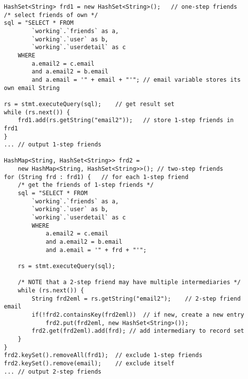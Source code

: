 \begin{lstlisting}
HashSet<String> frd1 = new HashSet<String>();	// one-step friends
/* select friends of own */
sql = "SELECT * FROM
		`working`.`friends` as a,
		`working`.`user` as b,
		`working`.`userdetail` as c
	WHERE
		a.email2 = c.email
		and a.email2 = b.email
		and a.email = '" + email + "'"; // email variable stores its own email String

rs = stmt.executeQuery(sql);	// get result set
while (rs.next()) {
	frd1.add(rs.getString("email2"));	// store 1-step friends in frd1
}
...	// output 1-step friends

HashMap<String, HashSet<String>> frd2 =
	new HashMap<String, HashSet<String>>(); // two-step friends
for (String frd : frd1) {	// for each 1-step friend
	/* get the friends of 1-step friends */
	sql = "SELECT * FROM
		`working`.`friends` as a,
		`working`.`user` as b,
		`working`.`userdetail` as c
		WHERE
			a.email2 = c.email
			and a.email2 = b.email
			and a.email = '" + frd + "'";

	rs = stmt.executeQuery(sql);

	/* NOTE that a 2-step friend may have multiple intermediaries */
	while (rs.next()) {
		String frd2eml = rs.getString("email2");	// 2-step friend email
		if(!frd2.containsKey(frd2eml))	// if new, create a new entry
			frd2.put(frd2eml, new HashSet<String>());
		frd2.get(frd2eml).add(frd);	// add intermediary to record set
	}
}
frd2.keySet().removeAll(frd1);	// exclude 1-step friends
frd2.keySet().remove(email);	// exclude itself
...	// output 2-step friends
\end{lstlisting}
